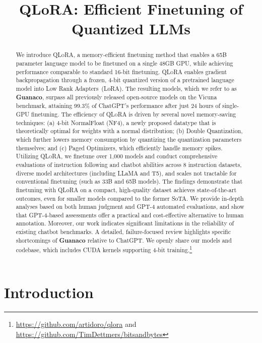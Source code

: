 \title{QLoRA: Efficient Finetuning of Quantized LLMs}

\begin{abstract}
We introduce \textsc{QLoRA}, a memory-efficient finetuning method that enables a 65B parameter language model to be finetuned on a single 48GB GPU, while achieving performance comparable to standard 16-bit finetuning. \textsc{QLoRA} enables gradient backpropagation through a frozen, 4-bit quantized version of a pretrained language model into Low Rank Adapters~(LoRA). The resulting models, which we refer to as \textbf{Guanaco}, surpass all previously released open-source models on the Vicuna benchmark, attaining 99.3\% of ChatGPT's performance after just 24 hours of single-GPU finetuning. The efficiency of \textsc{QLoRA} is driven by several novel memory-saving techniques: (a) 4-bit NormalFloat (NF4), a newly proposed datatype that is theoretically optimal for weights with a normal distribution; (b) Double Quantization, which further lowers memory consumption by quantizing the quantization parameters themselves; and (c) Paged Optimizers, which efficiently handle memory spikes. Utilizing \textsc{QLoRA}, we finetune over 1,000 models and conduct comprehensive evaluations of instruction following and chatbot abilities across 8 instruction datasets, diverse model architectures (including LLaMA and T5), and scales not tractable for conventional finetuning (such as 33B and 65B models). The findings demonstrate that finetuning with QLoRA on a compact, high-quality dataset achieves state-of-the-art outcomes, even for smaller models compared to the former SoTA. We provide in-depth analyses based on both human judgment and GPT-4 automated evaluations, and show that GPT-4-based assessments offer a practical and cost-effective alternative to human annotation. Moreover, our work indicates significant limitations in the reliability of existing chatbot benchmarks. A detailed, failure-focused review highlights specific shortcomings of \textbf{Guanaco} relative to ChatGPT. We openly share our models and codebase, which includes CUDA kernels supporting 4-bit training.\footnote{\url{https://github.com/artidoro/qlora} and \url{https://github.com/TimDettmers/bitsandbytes}}
\end{abstract}

\section{Introduction}

